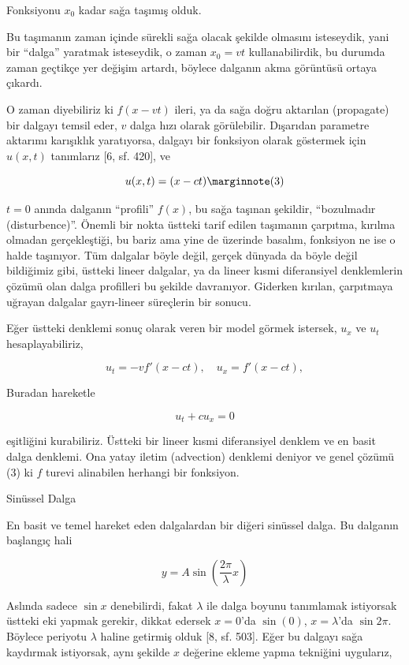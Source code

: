 \documentclass[12pt,fleqn]{article}\usepackage{../../common}
\begin{document}
Fonksiyonu $x_0$ kadar sağa taşımış olduk.

Bu taşımanın zaman içinde sürekli sağa olacak şekilde olmasını isteseydik, yani
bir ``dalga'' yaratmak isteseydik, o zaman $x_0 = v t$ kullanabilirdik, bu
durumda zaman geçtikçe yer değişim artardı, böylece dalganın akma görüntüsü
ortaya çıkardı.

O zaman diyebiliriz ki $f(x-vt)$ ileri, ya da sağa doğru aktarılan (propagate)
bir dalgayı temsil eder, $v$ dalga hızı olarak görülebilir. Dışarıdan parametre
aktarımı karışıklık yaratıyorsa, dalgayı bir fonksiyon olarak göstermek için
$u(x,t)$ tanımlarız [6, sf. 420], ve

$$
u(x,t) = (x - ct)
\mlabel{3}
$$

$t=0$ anında dalganın ``profili'' $f(x)$, bu sağa taşınan şekildir, ``bozulmadır
(disturbence)''. Önemli bir nokta üstteki tarif edilen taşımanın çarpıtma,
kırılma olmadan gerçekleştiği, bu bariz ama yine de üzerinde basalım, fonksiyon
ne ise o halde taşınıyor. Tüm dalgalar böyle değil, gerçek dünyada da böyle
değil bildiğimiz gibi, üstteki lineer dalgalar, ya da lineer kısmi diferansiyel
denklemlerin çözümü olan dalga profilleri bu şekilde davranıyor. Giderken
kırılan, çarpıtmaya uğrayan dalgalar gayrı-lineer süreçlerin bir sonucu.

Eğer üstteki denklemi sonuç olarak veren bir model görmek istersek, $u_x$ ve
$u_t$ hesaplayabiliriz,

$$
u_t = -v f'(x-ct), \quad  u_x = f'(x-ct), 
$$

Buradan hareketle

$$
u_t + c u_x = 0
$$

eşitliğini kurabiliriz. Üstteki bir lineer kısmi diferansiyel denklem ve en
basit dalga denklemi. Ona yatay iletim (advection) denklemi deniyor ve genel
çözümü (3) ki $f$ turevi alinabilen herhangi bir fonksiyon.

Sinüssel Dalga

En basit ve temel hareket eden dalgalardan bir diğeri sinüssel dalga. Bu
dalganın başlangıç hali

$$
y = A \sin \left( \frac{2\pi}{\lambda} x \right)
$$

Aslında sadece $\sin x$ denebilirdi, fakat $\lambda$ ile dalga boyunu tanımlamak
istiyorsak üstteki eki yapmak gerekir, dikkat edersek $x = 0$'da $\sin(0)$,
$x = \lambda$'da  $\sin 2\pi$. Böylece periyotu $\lambda$ haline getirmiş
olduk [8, sf. 503]. Eğer bu dalgayı sağa kaydırmak istiyorsak, aynı şekilde
$x$ değerine ekleme yapma tekniğini uygularız,
\end{document}
